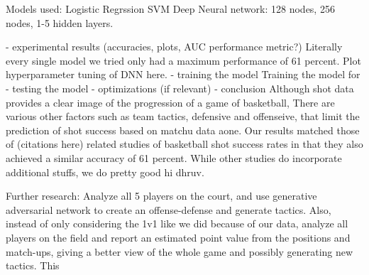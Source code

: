 \documentclass[12pt]{article}
\begin{document}
Models used:
Logistic Regrssion
SVM
Deep Neural network:
128 nodes, 256 nodes, 1-5 hidden layers.


- experimental results (accuracies, plots, AUC performance metric?)
Literally every single model we tried only had a maximum performance of 61 percent.
Plot hyperparameter tuning of DNN here.
- training the model
Training the model for
- testing the model
- optimizations (if relevant)
- conclusion
Although shot data provides a clear image of the progression of a game of basketball, There are various other factors such as team tactics, defensive and offenseive, that limit the prediction of shot success based on matchu data aone. Our results matched those of (citations here) related studies of basketball shot success rates in that they also achieved a similar accuracy of 61 percent. While other studies do incorporate additional stuffs, we do pretty good hi dhruv.


Further research: Analyze all 5 players on the court, and use generative adversarial network to create an offense-defense and generate tactics. Also, instead of only considering the 1v1 like we did because of our data, analyze all players on the field and report an estimated point value from the positions and match-ups, giving a better view of the whole game and possibly generating new tactics.
This
\end{document}
